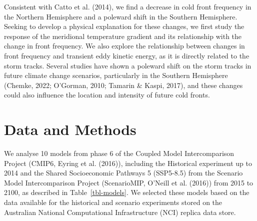 \documentclass[
]{agujournal2019}
\begin{document}
Consistent with Catto et al. (2014), we find a decrease in cold front
frequency in the Northern Hemisphere and a poleward shift in the
Southern Hemisphere. Seeking to develop a physical explanation for these
changes, we first study the response of the meridional temperature
gradient and its relationship with the change in front frequency. We
also explore the relationship between changes in front frequency and
transient eddy kinetic energy, as it is directly related to the storm
tracks. Several studies have shown a poleward shift on the storm tracks
in future climate change scenarios, particularly in the Southern
Hemisphere (Chemke, 2022; O'Gorman, 2010; Tamarin \& Kaspi, 2017), and
these changes could also influence the location and intensity of future
cold fronts.

\section{Data and Methods}\label{data-and-methods}

We analyse 10 models from phase 6 of the Coupled Model Intercomparison
Project (CMIP6, Eyring et al. (2016)), including the Historical
experiment up to 2014 and the Shared Socioeconomic Pathways 5 (SSP5-8.5)
from the Scenario Model Intercomparison Project (ScenarioMIP, O'Neill et
al. (2016)) from 2015 to 2100, as described in Table~\ref{tbl-models}.
We selected these models based on the data available for the historical
and scenario experiments stored on the Australian National Computational
Infrastructure (NCI) replica data store.
\end{document}
